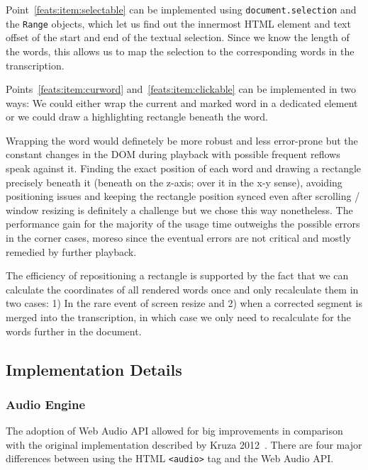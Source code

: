 \documentclass{llncs}
\begin{document}
Point~\ref{feats:item:selectable} can be implemented using
\texttt{document.selection} and the \texttt{Range} objects, which let us find
out the innermost HTML element and text offset of the start and end of the
textual selection. Since we know the length of the words, this allows us to map
the selection to the corresponding words in the transcription.

Points~\ref{feats:item:curword} and~\ref{feats:item:clickable} can be
implemented in two ways: We could either wrap the current and marked word in a
dedicated element or we could draw a highlighting rectangle beneath the word.

Wrapping the word would definetely be more robust and less error-prone but the
constant changes in the DOM during playback with possible frequent reflows speak
against it. Finding the exact position of each word and drawing a rectangle
precisely beneath it (beneath on the z-axis; over it in the x-y sense), avoiding
positioning issues and keeping the rectangle position synced even after scrolling
/ window resizing is definitely a challenge but we chose this way nonetheless.
The performance gain for the majority of the usage time outweighs the possible
errors in the corner cases, moreso since the eventual errors are not critical
and mostly remedied by further playback.

The efficiency of repositioning a rectangle is supported by the fact that we can
calculate the coordinates of all rendered words once and only recalculate them
in two cases: 1) In the rare event of screen resize and 2) when a corrected
segment is merged into the transcription, in which case we only need to
recalculate for the words further in the document.

\subsection{Implementation Details}

\subsubsection{Audio Engine}

The adoption of Web Audio API allowed for big improvements in comparison with
the original implementation described by Kruza 2012~\cite{kruuza2012making}.
There are four major differences between using the HTML \texttt{<audio>} tag
and the Web Audio API.
\end{document}
